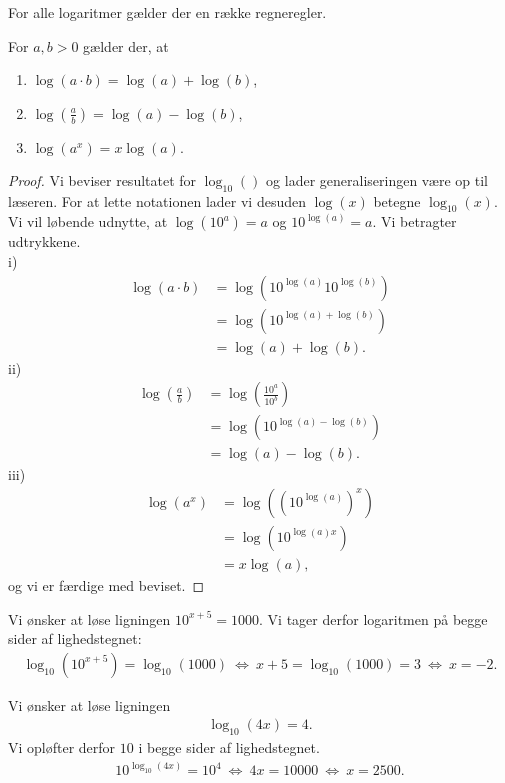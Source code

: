 For alle logaritmer gælder der en række regneregler. 
\begin{setn}[Logaritmeregneregler]
	For $a,b>0$ gælder der, at
	\begin{enumerate}[label=\roman*)]
		\item $\log(a\cdot b) = \log(a)+ \log(b)$,
		\item $\log\left(\frac{a}{b}\right) = \log(a)-\log(b)$,
		\item $\log(a^x) = x\log(a).$
	\end{enumerate}		
\end{setn}
\begin{proof}
	Vi beviser resultatet for $\log_{10}()$ og lader generaliseringen være op til læseren. For at lette 
	notationen lader vi desuden $\log(x)$ betegne $\log_{10}(x)$.
	Vi vil løbende udnytte, at $\log(10^a) = a$ og $10^{\log(a)} = a$. Vi betragter udtrykkene.
	\\
	i)
	\begin{align*}
		\log(a\cdot b) &= \log(10^{\log(a)}10^{\log(b)}) \\
		&= \log(10^{\log(a)+\log(b)})\\
		&=\log(a) + \log(b).
	\end{align*}
	ii)
	\begin{align*}
		\log\left(\frac{a}{b}\right) &= \log\left(\frac{10^a}{10^b}\right)\\
		&= \log(10^{\log(a)-\log(b)})\\
		&= \log(a)-\log(b).
	\end{align*}
	iii)
	\begin{align*}
		\log(a^x) &= \log\left( \left(10^{\log(a)}\right)^x\right)\\
		&= \log\left(10^{\log(a)x}\right)\\
		&= x\log(a),
    \end{align*}		
    og vi er færdige med beviset. 
\end{proof}

\begin{exa}
	Vi ønsker at løse ligningen $10^{x+5} = 1000$. Vi tager derfor logaritmen på begge sider af lighedstegnet:
	\begin{align*}
		\log_{10}\left(10^{x+5}\right) = \log_{10}(1000) \ \Leftrightarrow \ x+5 = \log_{10}(1000) = 3 \ \Leftrightarrow	\ x = -2.
	\end{align*}	 
\end{exa}
\begin{exa}
	Vi ønsker at løse ligningen 
	\begin{align*}
		\log_{10}(4x) = 4. 
	\end{align*}
	Vi opløfter derfor $10$ i begge sider af lighedstegnet.
	\begin{align*}
		10^{\log_{10}(4x)} = 10^4 \ \Leftrightarrow \ 4x = 10000 \ \Leftrightarrow	\ x = 2500.
	\end{align*}
\end{exa}


